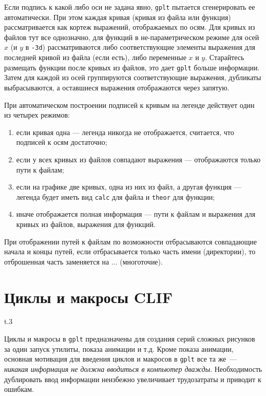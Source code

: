 \documentclass[12pt]{article}
\def\gplt{{\tt gplt}}
\begin{document}
Если подпись к какой либо оси не задана явно, \gplt{} пытается сгенерировать ее автоматически.
При этом каждая кривая (кривая из файла или функция) рассматривается как кортеж выражений, отображаемых по осям.
Для кривых из файлов тут все однозначно, для функций в не-параметрическом режиме для осей $x$ (и $y$ в \verb'-3d')
рассматриваются либо соответствующие элементы выражения для последней кривой из файла (если есть), либо 
переменные $x$ и $y$. Старайтесь размещать функции после кривых из файлов, это дает \gplt{} больше информации.
Затем для каждой из осей группируются соответствующие выражения, дубликаты выбрасываются, а оставшиеся выражения отображаются через запятую.

При автоматическом построении подписей к кривым на легенде действует один из четырех режимов:
\begin{enumerate}
\item если кривая одна --- легенда никогда не отображается, считается, что подписей к осям достаточно;
\item если у всех кривых из файлов совпадают выражения --- отображаются только пути к файлам;
\item если на графике две кривых, одна из них из файл, а другая функция --- легенда будет иметь вид \verb'calc' для файла и \verb'theor' для функции;
\item иначе отображается полная информация --- пути к файлам и выражения для кривых из файлов, выражения для функций.
\end{enumerate}
При отображении путей к файлам по возможности отбрасываются совпадающие начала и концы путей, если отбрасывается только часть имени (директории),
то отброшенная часть заменяется на ...
(многоточие).
\pagebreak

\section{Циклы и макросы CLIF}\label{clif:sec}
\begin{wrapfigure}[7]{t}{.3\textwidth}
  \vphantom{.}
  \vspace{-3cm}

\end{wrapfigure}
Циклы и макросы в \gplt{} предназначены для создания серий сложных рисунков за один запуск утилиты, показа анимации и т.д.
Кроме показа анимации, основная мотивация для введения циклов и макросов в \gplt{} все та же~--- {\it никакая информация не должна вводиться в компьютер дважды}.
Необходимость дублировать ввод информации неизбежно увеличивает трудозатраты и приводит к ошибкам.
\end{document}
